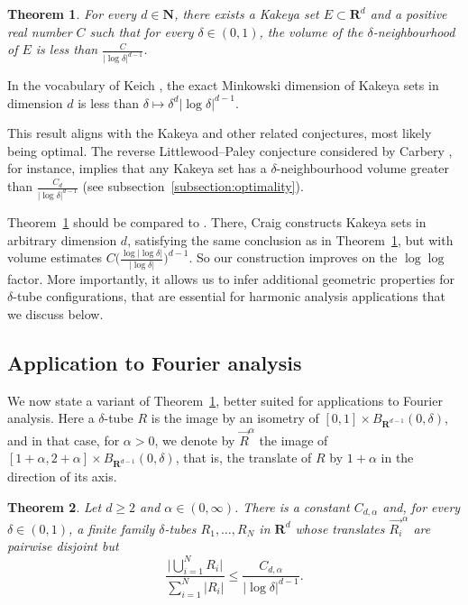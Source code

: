 \documentclass[10pt]{amsart}
\newcommand\translate[2]{\overrightarrow{#1}^{#2}}
\newcommand{\R}{\mathbf{R}}
\newcommand{\N}{\mathbf{N}}
\newtheorem{theorem}{Theorem}[section]
\begin{document}
\begin{theorem}\label{thm: main_kakeya} For every $d\in \N$, there exists a Kakeya set $E\subset \R^d$ and a positive real number $C$ such that for every $\delta \in (0,1)$, the volume of the $\delta$-neighbourhood of $E$ is less than  $\frac{C}{|\log\delta|^{d-1}}$.
\end{theorem}
In the vocabulary of Keich \cite{RefWorks:keich1999lp}, the exact Minkowski dimension of Kakeya sets in dimension $d$ is less than $\delta \mapsto \delta^d |\log \delta|^{d-1}$.

This result aligns with the Kakeya and other related conjectures, most likely being optimal. The reverse
Littlewood--Paley conjecture considered by Carbery \cite{carbery2015remarkreverselittlewoodpaleyrestriction}, for instance, implies that any Kakeya set has a $\delta$-neighbourhood volume greater than $\frac{C_d}{|\log\delta|^{d-1}}$ (see subsection~\ref{subsection:optimality}).

Theorem~\ref{thm: main_kakeya} should be compared to \cite[Proposition 3.1]{CraigJGA}. There, Craig constructs Kakeya sets in arbitrary dimension $d$,  satisfying the same conclusion as in Theorem~\ref{thm: main_kakeya}, but with volume estimates $C\Big(\frac{\log |\log \delta|}{|\log \delta|}\Big)^{d-1}$. So our construction improves on the $\log \log$ factor. More importantly, it allows us to infer additional geometric properties for $\delta$-tube configurations, that are essential for harmonic analysis applications that we discuss below.
\subsection{Application to Fourier analysis}


We now state a variant of Theorem~\ref{thm: main_kakeya}, better suited for applications to Fourier analysis. Here a $\delta$-tube $R$ is the image by an isometry of $[0,1]\times B_{\R^{d-1}}(0,\delta)$, and in that case, for $\alpha>0$, we denote by $\translate{R}{\alpha}$ the image of $[1+\alpha,2+\alpha]\times B_{\R^{d-1}}(0,\delta)$, that is, the translate of $R$ by $1+\alpha$ in the direction of its axis.
\begin{theorem}\label{thm:main_tubes} Let $d \geq 2$ and $\alpha\in (0,\infty)$. There is a constant $C_{d,\alpha}$ and, for every $\delta\in(0,1)$, a finite family $\delta$-tubes $R_1,\dots,R_N$ in $\R^d$ whose translates $\translate{R_i}{\alpha}$ are pairwise disjoint but
  \[ \frac{\big|\bigcup_{i=1}^N R_i\big|}{\sum_{i=1}^N |R_i|} \leq \frac {C_{d,\alpha}}{|\log \delta|^{d-1}}.\]
\end{theorem}
\end{document}
